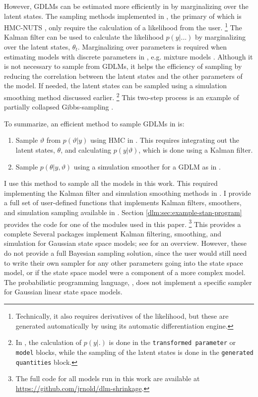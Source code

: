 However, GDLMs can be estimated more efficiently in \Stan{} by marginalizing over the latent states.
The sampling methods implemented in \Stan{}, the primary of which is HMC-NUTS \parencites{HoffmanGelman2014a}, only require the calculation of a likelihood from the user.%
\footnote{Technically, it also requires derivatives of the likelihood, but these are generated automatically by \Stan{} using its automatic differentiation engine.}
The Kalman filter can be used to calculate the likelihood $p(y | ...)$ by marginalizing over the latent states, $\theta_{t}$. 
Marginalizing over parameters is required when estimating models with discrete parameters in \Stan{}, e.g. mixture models \parencite[104]{Stan2015a}.
Although it is not necessary to sample from GDLMs, it helps the efficiency of sampling by reducing the correlation between the latent states and the other parameters of the model.%
If needed, the latent states can be sampled using a simulation smoothing method discussed earlier.%
\footnote{In \Stan{}, the calculation of $p(y| .)$ is done in the \texttt{transformed parameter} or \texttt{model} blocks, while the sampling of the latent states is done in the \texttt{generated quantities} block.}
This two-step process is an example of partially collapsed Gibbs-sampling \parencite{VanDykPark2008a}.

To summarize, an efficient method to sample GDLMs in \Stan{} is:
\begin{enumerate}
\item Sample $\vartheta$ from $p(\vartheta | y)$ using HMC in \Stan{}.
  This requires integrating out the latent states, $\theta$, and calculating $p(y | \vartheta)$, which is done using a Kalman filter.
\item Sample $p(\theta | y, \vartheta)$ using a simulation smoother for a GDLM as in  \parencites{CarterKohn1994}{Fruehwirth-Schnatter1994}{DeJongShephard1995}{DurbinKoopman2002}[Ch 4.9]{DurbinKoopman2012}.
\end{enumerate}
I use this method to sample all the models in this work.
This required implementing the Kalman filter and simulation smoothing methods in \Stan{}.
I provide a full set of user-defined \Stan{} functions that implements Kalman filters, smoothers, and simulation sampling available in .
Section \ref{dlm:sec:example-stan-program} provides the code for one of the \Stan{} modules used in this paper.%
\footnote{The full code for all models run in this work are available at \url{https://github.com/jrnold/dlm-shrinkage}.}
This provides a complete 
Several \RLang{} packages implement Kalman filtering, smoothing, and simulation for Gaussian state space models; see \textcite{Tusell2011} for an overview.
However, these do not provide a full Bayesian sampling solution, since the user would still need to write their own sampler for any other parameters going into the state space model, or if the state space model were a component of a more complex model.
The  probabilistic programming language, , does not implement a specific sampler for Gaussian linear state space models.


